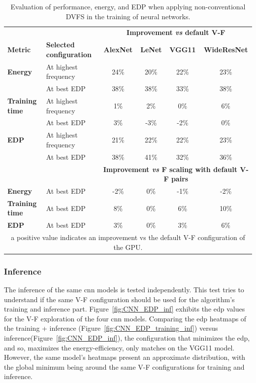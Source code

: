 \begin{table}[htbp]
    \centering
    \label{tab:trainingMetricsResults}
    \begin{tabular}{llcccc}
        &  &  \multicolumn{4}{c}{\textbf{Improvement {\it vs} default V-F}} \\ 
        \cline{3-6} 
        \bf Metric &  \bf Selected configuration &    \textbf{AlexNet} &  \textbf{LeNet} &  \textbf{VGG11} &  \textbf{WideResNet} \\ \hline
        \textbf{Energy}        & At highest frequency & 24\% & 20\% & 22\% & 23\% \\
        \textbf{}              & At best EDP          & 38\% & 38\% & 33\% & 38\% \\\hline
        \textbf{Training time} & At highest frequency & 1\%  & 2\%  & 0\%  & 6\%  \\
        \textbf{}              & At best EDP          & 3\%  & -3\% & -2\% & 0\% \\\hline
        \textbf{EDP}           & At highest frequency & 21\% & 22\% & 22\% & 23\% \\
        \textbf{}              & At best EDP          & 38\% & 41\% & 32\% & 36\% \\ \hline
        
        &  &\multicolumn{4}{c}{\textbf{Improvement {\it vs} F scaling with default V-F pairs}} \\ \hline
        \textbf{Energy}        &At best EDP&  -2\% & 0\% & -1\% & -2\% \\\hline
        \textbf{Training time} &At best EDP&  8\%  & 0\%  & 6\%  & 10\%  \\\hline
        \textbf{EDP}           &At best EDP&  3\% & 0\% & 3\% & 6\% \\ \hline
        \multicolumn{6}{c}{a positive value indicates an improvement vs the default V-F configuration of the GPU.} \\
    \end{tabular}%
    \caption{Evaluation of performance, energy, and EDP when applying non-conventional DVFS in the training of neural networks.}
\end{table}

\newpage

\subsubsection{Inference}

The inference of the same \acrshort{cnn} models is tested independently. This test tries to understand if the same V-F configuration should be used for the algorithm's training and inference part. Figure~\ref{fig:CNN_EDP_inf} exhibits the \acrshort{edp} values for the V-F exploration of the four \acrshort{cnn} models. Comparing the \acrshort{edp} heatmaps of the training + inference (Figure~\ref{fig:CNN_EDP_training_inf}) versus inference(Figure~\ref{fig:CNN_EDP_inf}), the configuration that minimizes the \acrshort{edp}, and so, maximizes the energy-efficiency, only matches on the VGG11 model. However, the same model's heatmaps present an approximate distribution, with the global minimum being around the same V-F configurations for training and inference.

